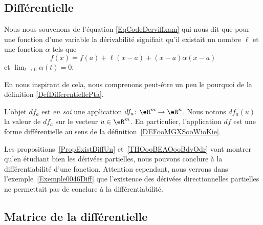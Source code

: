 \subsection{Différentielle}

Nous nous souvenons de l'équation \eqref{EqCodeDerviffxam} qui nous dit que pour une fonction d'une variable la dérivabilité signifiait qu'il existait un nombre \( \ell\) et une fonction \( \alpha\) tels que
\begin{equation}
	f(x)=f(a)+\ell(x-a)+(x-a)\alpha(x-a)
\end{equation}
et \( \lim_{t\to 0} \alpha(t)=0\).

En nous inspirant de cela, nous comprenons peut-être un peu le pourquoi de la définition \ref{DefDifferentiellePta}.

\begin{normaltext}
	L'objet \( df_a\) est \emph{en soi} une application \( df_a\colon \eR^m\to \eR^n\). Nous notons \( df_a(u)\) la valeur de \( df_a\) sur le vecteur \( u\in\eR^m\). En particulier, l'application \( df\) est une forme différentielle au sens de la définition~\ref{DEFooMGXSooWioKie}.
\end{normaltext}

\begin{normaltext}
	Les propositions~\ref{PropExistDiffUn} et~\ref{THOooBEAOooBdvOdr} vont montrer qu'en étudiant bien les dérivées partielles, nous pouvons conclure à la différentiabilité d'une fonction.
	Attention cependant, nous verrons dans l'exemple~\ref{Exemple0046Diff} que l'existence des dérivées directionnelles partielles ne permettait pas de conclure à la différentiabilité.
\end{normaltext}

\subsection{Matrice de la différentielle}

